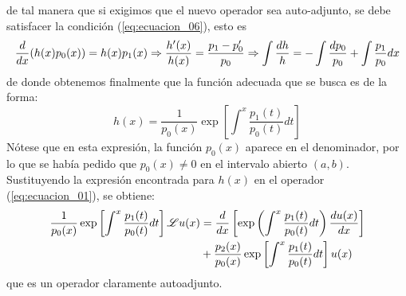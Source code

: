 de tal manera que si exigimos que el nuevo operador sea auto-adjunto, se debe satisfacer la condición (\ref{eq:ecuacion_06}), esto es
\[ \dfrac{d {}}{d x} (h(x) p_{0}(x)) = h(x)p_{1}(x) \Rightarrow \dfrac{h^{\prime}(x)}{h(x)} = \dfrac{p_{1} - p^{\prime}_{0}}{p_{0}}  \Rightarrow \int \dfrac{d h}{h} = - \int \dfrac{d p_{0}}{p_{0}} + \int \dfrac{p_{1}}{p_{0}} dx \]
de donde obtenemos finalmente que la función adecuada que se busca es de la forma:
\begin{equation}
h(x) = \dfrac{1}{p_{0}(x)} \exp \left[ \int^{x} \dfrac{p_{1}(t)}{p_{0}(t)} dt \right]
\label{eq:ecuacion_12}
\end{equation}
Nótese que en esta expresión, la función $p_{0}(x)$ aparece en el denominador, por lo que se había pedido que $p_{0}(x) \neq 0$ en el intervalo abierto $(a,b)$. Sustituyendo la expresión encontrada para $h(x)$ en el operador (\ref{eq:ecuacion_01}), se obtiene:
\begin{equation}
\begin{split}
\dfrac{1}{p_{0}(x)} \exp \left[ \int^{x} \dfrac{p_{1}(t)}{p_{0}(t)} dt \right] \mathscr{L} u(x) &= \dfrac{d {}}{d x} \left[ \exp \left( \int^{x} \dfrac{p_{1}(t)}{p_{0}(t)} dt \right) \dfrac{d {u(x)}}{d x} \right] \\
&+ \dfrac{p_{2}(x)}{p_{0}(x)} \exp \left[ \int^{x} \dfrac{p_{1}(t)}{p_{0}(t)} dt \right] u(x)
\end{split}
\label{eq:ecuacion_13}
\end{equation}
que es un operador claramente autoadjunto.
